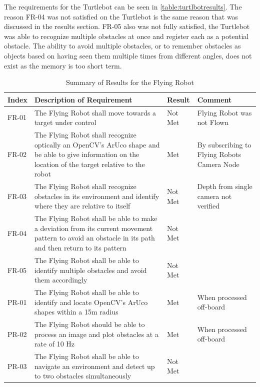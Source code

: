 \documentclass{article}[12]
\begin{document}
 The requirements for the Turtlebot can be seen in \ref{table:turtlbotresults}. The reason FR-04 was not satisfied on the Turtlebot is the same reason that was discussed in the results section. FR-05 also was not fully satisfied, the Turtlebot was able to recognize multiple obstacles at once and register each as a potential obstacle. The ability to avoid multiple obstacles, or to remember obstacles as objects based on having seen them multiple times from different angles, does not exist as the memory is too short term.

	\begin{table}[H]
  \small
		\begin{tabular}{p{2cm} p{8cm} p{2cm} p{3cm}}
			\hline
			{\textbf{Index}} & {\textbf{Description of Requirement}} & {\textbf{Result}} & {\textbf{Comment}} \\ \hline
FR-01 & The Flying Robot shall move towards a target under control & Not Met & Flying Robot was not Flown \\
FR-02 & The Flying Robot shall recognize optically an OpenCV's ArUco shape and be able to give information on the location of the target relative to the robot & Met & By subscribing to Flying Robots Camera Node\\
FR-03 & The Flying Robot shall recognize obstacles in its environment and identify where they are relative to itself & Not Met & Depth from single camera not verified\\
FR-04 & The Flying Robot shall be able to make a deviation from its current movement pattern to avoid an obstacle in its path and then return to its pattern & Not Met &  \\
FR-05 & The Flying Robot shall be able to identify multiple obstacles and avoid them accordingly & Not Met  &\\
PR-01 & The Flying Robot shall be able to identify and locate OpenCV's ArUco shapes within a 15m radius & Met & When processed off-board\\
PR-02 & The Flying Robot should be able to process an image and plot obstacles at a rate of 10 Hz & Met & When processed off-board \\
PR-03 & The Flying Robot shall be able to navigate an environment and detect up to two obstacles simultaneously & Not Met & \\ \hline
		\end{tabular}
		\caption{Summary of Results for the Flying Robot}
		\label{table:uavresults}
 \end{table}
\end{document}
